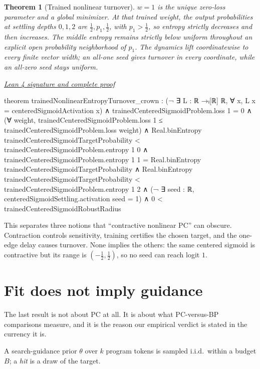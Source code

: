 \documentclass[11pt]{article}
\newtheorem{theorem}{Theorem}[section]
\newcommand{\leancommit}{f3a31db36bb2f944312ee31c1d86c2758109e83a}
\newcommand{\leansignaturelink}[2]{%
  \par\Needspace{0.3\textheight}\smallskip\noindent
  \href{https://github.com/zariuq/MeTTapedia/blob/\leancommit/#1\#L#2}{%
    \scriptsize\itshape Lean 4 signature and complete proof}\par\nobreak}
\begin{document}
\begin{theorem}[Trained nonlinear turnover]\label{thm:trainednonlin}
$w=1$ is the unique zero-loss parameter and a global minimizer. At that trained weight,
the output probabilities at settling depths $0,1,2$ are
$\tfrac12,p_1,\tfrac12$, with $p_1>\tfrac12$, so entropy strictly decreases and then
increases. The middle entropy remains strictly below uniform throughout an explicit
open probability neighborhood of $p_1$. The dynamics lift coordinatewise to every
finite vector width; an all-one seed gives turnover in every coordinate, while an
all-zero seed stays uniform.
\end{theorem}

\leansignaturelink{lean/mettapedia/Mettapedia/MachineLearning/NeuralNetworks/%
PredictiveCoding/TrainedNonlinearTurnover.lean}{432}
\begin{leansignature}
theorem trainedNonlinearEntropyTurnover_crown :
    (¬ ∃ L : ℝ →ₗ[ℝ] ℝ, ∀ x, L x = centeredSigmoidActivation x) ∧
      trainedCenteredSigmoidProblem.loss 1 = 0 ∧
      (∀ weight, trainedCenteredSigmoidProblem.loss 1 ≤
        trainedCenteredSigmoidProblem.loss weight) ∧
      Real.binEntropy trainedCenteredSigmoidTargetProbability <
        trainedCenteredSigmoidProblem.entropy 1 0 ∧
      trainedCenteredSigmoidProblem.entropy 1 1 =
        Real.binEntropy trainedCenteredSigmoidTargetProbability ∧
      Real.binEntropy trainedCenteredSigmoidTargetProbability <
        trainedCenteredSigmoidProblem.entropy 1 2 ∧
      (¬ ∃ seed : ℝ, centeredSigmoidSettling.activation seed = 1) ∧
      0 < trainedCenteredSigmoidRobustRadius
\end{leansignature}

This separates three notions that ``contractive nonlinear PC'' can obscure. Contraction
controls sensitivity, training certifies the chosen target, and the one-edge delay causes
turnover. None implies the others: the same centered sigmoid is contractive but its range
is $(-\tfrac12,\tfrac12)$, so no seed can reach logit $1$.

\section{Fit does not imply guidance}
\label{sec:yield}

The last result is not about PC at all. It is about what PC-versus-BP comparisons
measure, and it is the reason our empirical verdict is stated in the currency it is.

A search-guidance prior $\theta$ over $k$ program tokens is sampled i.i.d.\ within a
budget $B$; a \emph{hit} is a draw of the target.
\end{document}
